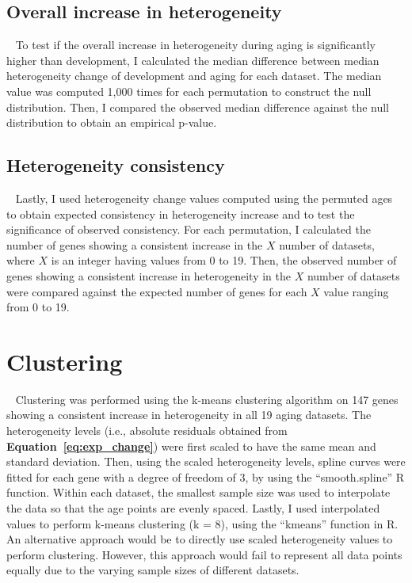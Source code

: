 \subsection{Overall increase in heterogeneity}~\label{subsec:perm.overall}
To test if the overall increase in heterogeneity during aging is significantly higher than development, 
I calculated the median difference between median heterogeneity change of development and aging for each dataset.
The median value was computed 1,000 times for each permutation to construct the null distribution.
Then, I compared the observed median difference against the null distribution to obtain an empirical p-value.

\subsection{Heterogeneity consistency}~\label{subsec:perm.consist}
Lastly, I used heterogeneity change values computed using the permuted ages to obtain expected consistency in heterogeneity increase and to test the significance of observed consistency.
For each permutation, I calculated the number of genes showing a consistent increase in the $X$ number of datasets, where $X$ is an integer having values from 0 to 19.
Then, the observed number of genes showing a consistent increase in heterogeneity in the $X$ number of datasets were compared against the expected number of genes for
each $X$ value ranging from 0 to 19.

\section{Clustering}~\label{sec:cluster}
Clustering was performed using the k-means clustering algorithm on 147 genes showing a consistent increase in heterogeneity in all 19 aging datasets.
The heterogeneity levels (i.e., absolute residuals obtained from \textbf{Equation~\ref{eq:exp_change}}) were first scaled to have the same mean and standard deviation. 
Then, using the scaled heterogeneity levels, spline curves were fitted for each gene with a degree of freedom of 3, by using the ``smooth.spline'' R function.
Within each dataset, the smallest sample size was used to interpolate the data so that the age points are evenly spaced.
Lastly, I used interpolated values to perform k-means clustering (k = 8), using the ``kmeans'' function in R.
An alternative approach would be to directly use scaled heterogeneity values to perform clustering. 
However, this approach would fail to represent all data points equally due to the varying sample sizes of different datasets.

